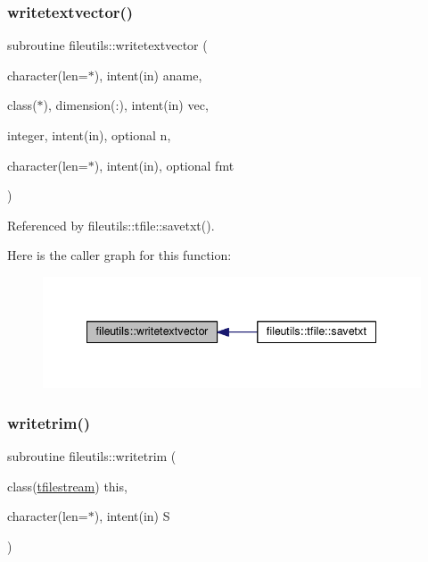 \subsubsection{\texorpdfstring{writetextvector()}{writetextvector()}}
{\footnotesize\ttfamily subroutine fileutils\+::writetextvector (\begin{DoxyParamCaption}\item[{character(len=$\ast$), intent(in)}]{aname,  }\item[{class($\ast$), dimension(\+:), intent(in)}]{vec,  }\item[{integer, intent(in), optional}]{n,  }\item[{character(len=$\ast$), intent(in), optional}]{fmt }\end{DoxyParamCaption})\hspace{0.3cm}{\ttfamily [private]}}



Referenced by fileutils\+::tfile\+::savetxt().

Here is the caller graph for this function\+:
\nopagebreak
\begin{figure}[H]
\begin{center}
\leavevmode
\includegraphics[width=342pt]{namespacefileutils_abd621ad851fccd7a5f79146e2841c380_icgraph}
\end{center}
\end{figure}
\mbox{\label{namespacefileutils_afe12625f20868804aae9ff245b783baf}} 
\subsubsection{\texorpdfstring{writetrim()}{writetrim()}}
{\footnotesize\ttfamily subroutine fileutils\+::writetrim (\begin{DoxyParamCaption}\item[{class(\mbox{\hyperlink{structfileutils_1_1tfilestream}{tfilestream}})}]{this,  }\item[{character(len=$\ast$), intent(in)}]{S }\end{DoxyParamCaption})\hspace{0.3cm}{\ttfamily [private]}}

